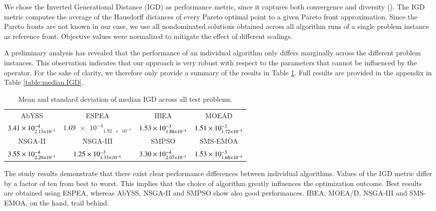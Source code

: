 We chose the Inverted Generational Distance (IGD) as performance metric, since it captures both convergence and diversity (\cite{van1998evolutionary}). The IGD metric computes the average of the Hausdorff distances of every Pareto optimal point to a given Pareto front approximation. Since the Pareto fronts are not known in our case, we use all nondominated solutions obtained across all algorithm runs of a single problem instance as reference front. Objective values were normalized to mitigate the effect of different scalings.

A preliminary analysis has revealed that the performance of an individual algorithm only differs marginally across the different problem instances. This observation indicates that our approach is very robust with respect to the parameters that cannot be influenced by the operator. For the sake of clarity, we therefore only provide a summary of the results in Table \ref{tbl:summary}. Full results are provided in the appendix in Table \ref{table:median.IGD}.

\begin{table}
\caption{Mean and standard deviation of median IGD across all test problems.}
\label{tbl:summary}
\centering
\begin{tabular}{*{4}{c}} \toprule
AbYSS & ESPEA & IBEA & MOEAD\\ \cmidrule(lr){1-1} \cmidrule(lr){2-2} \cmidrule(lr){3-3} \cmidrule(lr){4-4}
$\num{3.41E-4}_{\num{2.13E-5}}$ & $\num{1.69e-4}_{\num{1.92e-5}}$ & $\num{1.53E-3}_{\num{1.88E-4}}$ & $\num{1.51E-3}_{\num{1.72E-4}}$ \\ \midrule
NSGA-II & NSGA-III & SMPSO & SMS-EMOA \\ \cmidrule(lr){1-1} \cmidrule(lr){2-2} \cmidrule(lr){3-3} \cmidrule(lr){4-4}
$\num{3.55E-4}_{\num{2.20E-5}}$ & $\num{1.25E-3}_{\num{1.33E-4}}$ & $\num{3.30E-4}_{\num{2.07E-5}}$ & $\num{1.53E-3}_{\num{1.68E-4}}$ \\
\bottomrule
\end{tabular}
\end{table}


The study results demonstrate that there exist clear performance differences between individual algorithms. Values of the IGD metric differ by a factor of ten from best to worst. This implies that the choice of algorithm greatly influences the optimization outcome. Best results are obtained using ESPEA, whereas AbYSS, NSGA-II and SMPSO show also good performances. IBEA, MOEA/D, NSGA-III and SMS-EMOA, on the hand, trail behind.

